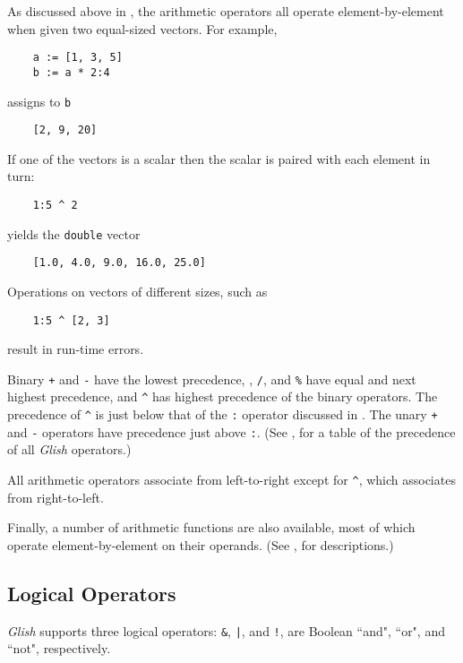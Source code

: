 As discussed above in ,
the arithmetic operators all
operate element-by-element when given two equal-sized vectors.  For example,
\begin{verbatim}
    a := [1, 3, 5]
    b := a * 2:4
\end{verbatim}
assigns to {\tt b}
\begin{verbatim}
    [2, 9, 20]
\end{verbatim}
If one of the vectors is a scalar then the scalar is paired with each element
in turn:
\begin{verbatim}
    1:5 ^ 2
\end{verbatim}
yields the {\tt double} vector
\begin{verbatim}
    [1.0, 4.0, 9.0, 16.0, 25.0]
\end{verbatim}
Operations on vectors of different sizes, such as
\begin{verbatim}
    1:5 ^ [2, 3]
\end{verbatim}
result in run-time errors.

Binary {\tt +} and {\tt -}
have the lowest precedence, {\tt *}, {\tt /}, and {\tt \%} have equal
and next highest precedence, and \verb+^+ has highest precedence of
the binary operators.  The precedence of \verb+^+ is just below that
of the {\tt :} operator discussed in .  The unary
{\tt +} and {\tt -} operators have precedence just above {\tt :}.
(See , for a table of the precedence of all {\em Glish}
operators.)

All arithmetic operators associate from left-to-right except for \verb+^+,
which associates from right-to-left.

Finally, a number of arithmetic functions are also available, most of which
operate element-by-element on their operands.  (See
, for descriptions.)

\subsection{Logical Operators}
\label{log-operators}

{\em Glish} supports three logical operators:
{\tt \&},
\verb+|+,
and {\tt !},
are Boolean ``and", ``or", and ``not", respectively.

